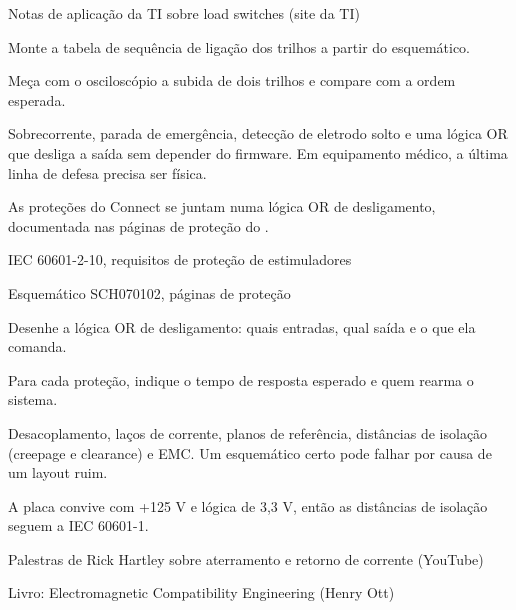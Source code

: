 \begin{paraestudar}
  \item Notas de aplicação da TI sobre load switches (site da TI)
\end{paraestudar}

\begin{pratique}
  \item Monte a tabela de sequência de ligação dos trilhos a partir do esquemático.
  \item Meça com o osciloscópio a subida de dois trilhos e compare com a ordem esperada.
\end{pratique}

Sobrecorrente, parada de emergência, detecção de eletrodo solto e uma lógica OR que desliga a saída sem depender do firmware. Em equipamento médico, a última linha de defesa precisa ser física.

\begin{noproduto}
As proteções do Connect se juntam numa lógica OR de desligamento, documentada nas páginas de proteção do .
\end{noproduto}

\begin{paraestudar}
  \item IEC 60601-2-10, requisitos de proteção de estimuladores
  \item Esquemático SCH070102, páginas de proteção
\end{paraestudar}

\begin{pratique}
  \item Desenhe a lógica OR de desligamento: quais entradas, qual saída e o que ela comanda.
  \item Para cada proteção, indique o tempo de resposta esperado e quem rearma o sistema.
\end{pratique}

Desacoplamento, laços de corrente, planos de referência, distâncias de isolação (creepage e clearance) e EMC. Um esquemático certo pode falhar por causa de um layout ruim.

\begin{noproduto}
A placa convive com +125 V e lógica de 3,3 V, então as distâncias de isolação seguem a IEC 60601-1.
\end{noproduto}

\begin{paraestudar}
  \item {}
  \item Palestras de Rick Hartley sobre aterramento e retorno de corrente (YouTube)
  \item Livro: Electromagnetic Compatibility Engineering (Henry Ott)
\end{paraestudar}

